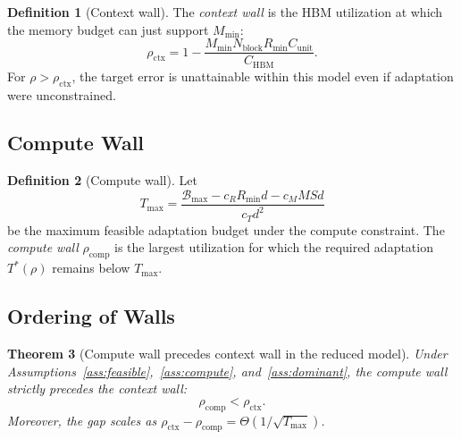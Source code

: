 \documentclass[11pt,a4paper]{article}
\theoremstyle{plain}
\newtheorem{theorem}{Theorem}[section]
\theoremstyle{definition}
\newtheorem{definition}[theorem]{Definition}
\begin{document}
\begin{definition}[Context wall]
The \emph{context wall} is the HBM utilization at which the memory budget can just support $M_{\min}$:
\begin{equation}
\rho_{\text{ctx}} = 1 - \frac{M_{\min}N_{\text{block}}R_{\min}C_{\text{unit}}}{C_{\text{HBM}}}.
\label{eq:ctxwall}
\end{equation}
For $\rho > \rho_{\text{ctx}}$, the target error is unattainable within this model even if adaptation were unconstrained.
\end{definition}

\subsection{Compute Wall}
\begin{definition}[Compute wall]
Let
\[
T_{\max} = \frac{\mathcal{B}_{\max} - c_R R_{\min}d - c_M M S d}{c_T d^2}
\]
be the maximum feasible adaptation budget under the compute constraint. The \emph{compute wall} $\rho_{\text{comp}}$ is the largest utilization for which the required adaptation $T^*(\rho)$ remains below $T_{\max}$.
\end{definition}

\subsection{Ordering of Walls}
\begin{theorem}[Compute wall precedes context wall in the reduced model]\label{thm:ordering}
Under Assumptions~\ref{ass:feasible},~\ref{ass:compute}, and~\ref{ass:dominant}, the compute wall strictly precedes the context wall:
\[
\rho_{\text{comp}} < \rho_{\text{ctx}}.
\]
Moreover, the gap scales as $\rho_{\text{ctx}} - \rho_{\text{comp}} = \Theta(1/\sqrt{T_{\max}})$.
\end{theorem}
\end{document}
